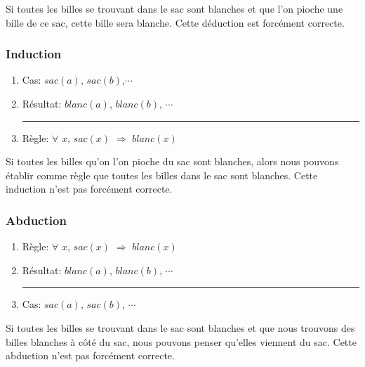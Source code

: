 Si toutes les billes se trouvant dans le sac sont blanches et que l'on pioche une bille de ce sac, cette bille sera blanche. Cette déduction est forcément correcte.

\subsubsection{Induction}

\begin{enumerate}
  \item Cas: $sac(a)$, $sac(b)$,$\cdots$
  \item Résultat: $blanc(a)$, $blanc(b)$, $\cdots$\\
  \rule{5.5cm}{.1pt}	
  \item Règle: $\forall$ $x$, $sac(x)$ $\Rightarrow$ $blanc(x)$
\end{enumerate}

Si toutes les billes qu'on l'on pioche du sac sont blanches, alors nous pouvons établir comme règle que toutes les billes dans le sac sont blanches. Cette induction n'est pas forcément correcte.

\subsubsection{Abduction}

\begin{enumerate}
  \item Règle: $\forall$ $x$, $sac(x)$ $\Rightarrow$ $blanc(x)$
  \item Résultat: $blanc(a)$, $blanc(b)$, $\cdots$\\
  \rule{5.5cm}{.1pt}
  \item Cas: $sac(a)$, $sac(b)$, $\cdots$
\end{enumerate}

Si toutes les billes se trouvant dans le sac sont blanches et que nous trouvons des billes blanches à côté du sac, nous pouvons penser qu'elles viennent du sac. Cette abduction n'est pas forcément correcte.
